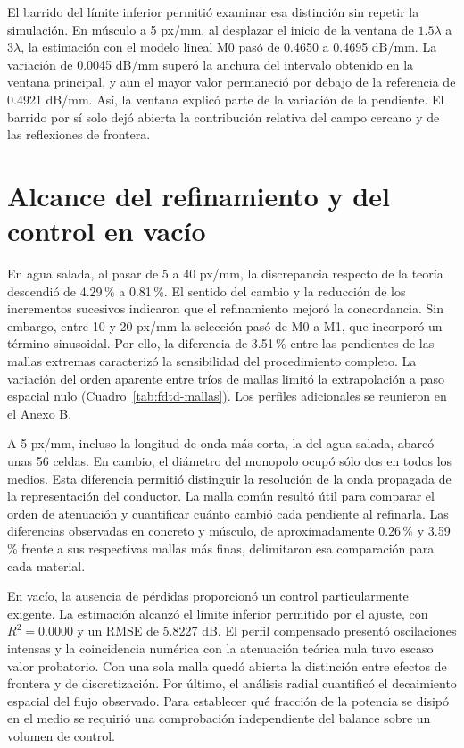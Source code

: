 El barrido del límite inferior permitió examinar esa distinción sin repetir la simulación. En músculo a 5 px/mm, al desplazar el inicio de la ventana de $1.5\lambda$ a $3\lambda$, la estimación con el modelo lineal M0 pasó de 0.4650 a 0.4695 dB/mm. La variación de 0.0045 dB/mm superó la anchura del intervalo obtenido en la ventana principal, y aun el mayor valor permaneció por debajo de la referencia de 0.4921 dB/mm. Así, la ventana explicó parte de la variación de la pendiente. El barrido por sí solo dejó abierta la contribución relativa del campo cercano y de las reflexiones de frontera.

\section{Alcance del refinamiento y del control en vacío}
En agua salada, al pasar de 5 a 40 px/mm, la discrepancia respecto de la teoría descendió de 4.29\,\% a 0.81\,\%. El sentido del cambio y la reducción de los incrementos sucesivos indicaron que el refinamiento mejoró la concordancia. Sin embargo, entre 10 y 20 px/mm la selección pasó de M0 a M1, que incorporó un término sinusoidal. Por ello, la diferencia de 3.51\,\% entre las pendientes de las mallas extremas caracterizó la sensibilidad del procedimiento completo. La variación del orden aparente entre tríos de mallas limitó la extrapolación a paso espacial nulo (Cuadro~\ref{tab:fdtd-mallas}). Los perfiles adicionales se reunieron en el \hyperref[an:fdtd-perfiles]{Anexo B}.

A 5 px/mm, incluso la longitud de onda más corta, la del agua salada, abarcó unas 56 celdas. En cambio, el diámetro del monopolo ocupó sólo dos en todos los medios. Esta diferencia permitió distinguir la resolución de la onda propagada de la representación del conductor. La malla común resultó útil para comparar el orden de atenuación y cuantificar cuánto cambió cada pendiente al refinarla. Las diferencias observadas en concreto y músculo, de aproximadamente 0.26\,\% y 3.59\,\% frente a sus respectivas mallas más finas, delimitaron esa comparación para cada material.

En vacío, la ausencia de pérdidas proporcionó un control particularmente exigente. La estimación alcanzó el límite inferior permitido por el ajuste, con $R^2=0.0000$ y un RMSE de 5.8227 dB. El perfil compensado presentó oscilaciones intensas y la coincidencia numérica con la atenuación teórica nula tuvo escaso valor probatorio. Con una sola malla quedó abierta la distinción entre efectos de frontera y de discretización. Por último, el análisis radial cuantificó el decaimiento espacial del flujo observado. Para establecer qué fracción de la potencia se disipó en el medio se requirió una comprobación independiente del balance sobre un volumen de control.

